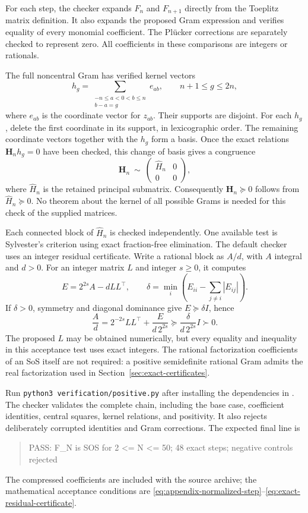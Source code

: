 For each step, the checker expands $F_n$ and $F_{n+1}$ directly
from the Toeplitz matrix definition. It also expands the proposed
Gram expression and verifies equality of every monomial coefficient.
The Pl\"ucker corrections are separately checked to represent zero.
All coefficients in these comparisons are integers or rationals.

The full noncentral Gram has verified kernel vectors
\[
 h_g=\sum_{\substack{-n\le a<0<b\le n\\b-a=g}}e_{ab},
 \qquad n+1\le g\le2n,
\]
where $e_{ab}$ is the coordinate vector for $z_{ab}$.
Their supports are disjoint. For each $h_g$, delete the first
coordinate in its support, in lexicographic order. The remaining
coordinate vectors together with the $h_g$ form a basis. Once
the exact relations $\mathbf H_nh_g=0$ have been checked, this change of
basis gives a congruence
\[
 \mathbf H_n\ \sim\ \begin{pmatrix}\widehat H_n&0\\0&0\end{pmatrix},
\]
where $\widehat H_n$ is the retained principal submatrix.
Consequently $\mathbf H_n\succeq0$ follows from $\widehat H_n\succeq0$.
No theorem about the kernel of all possible Grams is needed for
this check of the supplied matrices.

Each connected block of $\widehat H_n$ is checked independently.
One available test is Sylvester's criterion using exact
fraction-free elimination. The default checker uses an integer
residual certificate. Write a rational block as $A/d$, with
$A$ integral and $d>0$. For an integer matrix $L$ and integer
$s\ge0$, it computes
\begin{equation}\label{eq:exact-residual-certificate}
 E=2^{2s}A-dLL^\top,\qquad
 \delta=\min_i\left(E_{ii}-\sum_{j\ne i}|E_{ij}|\right).
\end{equation}
If $\delta>0$, symmetry and diagonal dominance give
$E\succeq\delta I$, hence
\[
 \frac{A}{d}
 =2^{-2s}LL^\top+\frac{E}{d\,2^{2s}}
 \succeq\frac{\delta}{d\,2^{2s}}I\succ0.
\]
The proposed $L$ may be obtained numerically, but every equality
and inequality in this acceptance test uses exact integers.
The rational factorization coefficients of an SoS itself are
not required: a positive semidefinite rational Gram admits the
real factorization used in Section~\ref{sec:exact-certificates}.

Run \texttt{python3 verification/positive.py} after installing
the dependencies in .
The checker validates the complete chain, including the base case,
coefficient identities, central squares, kernel relations, and
positivity. It also rejects deliberately corrupted identities
and Gram corrections. The expected final line is
\begin{quote}\small\ttfamily
PASS: F\_N is SOS for 2 <= N <= 50; 48 exact steps; negative controls rejected
\end{quote}
The compressed coefficients are included with the source archive;
the mathematical acceptance conditions are
\eqref{eq:appendix-normalized-step}--\eqref{eq:exact-residual-certificate}.

